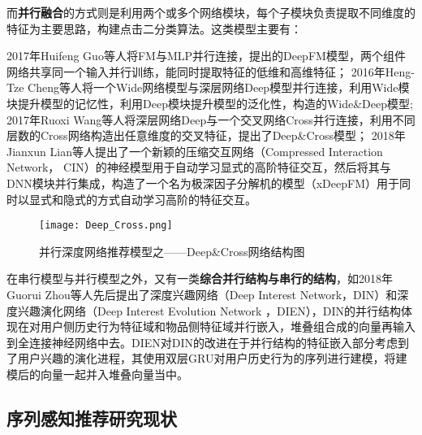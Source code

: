 而\textbf{并行融合}的方式则是利用两个或多个网络模块，每个子模块负责提取不同维度的特征为主要思路，构建点击二分类算法。这类模型主要有：


2017年Huifeng Guo等人将FM与MLP并行连接，提出的DeepFM模型，两个组件网络共享同一个输入并行训练，能同时提取特征的低维和高维特征；
2016年Heng-Tze Cheng等人将一个Wide网络模型与深层网络Deep模型并行连接，利用Wide模块提升模型的记忆性，利用Deep模块提升模型的泛化性，构造的Wide\&Deep模型;
2017年Ruoxi Wang等人将深层网络Deep与一个交叉网络Cross并行连接，利用不同层数的Cross网络构造出任意维度的交叉特征，提出了Deep\&Cross模型；
2018年Jianxun Lian等人提出了一个新颖的压缩交互网络（Compressed Interaction Network， CIN）的神经模型用于自动学习显式的高阶特征交互，然后将其与DNN模块并行集成，构造了一个名为极深因子分解机的模型（xDeepFM）用于同时以显式和隐式的方式自动学习高阶的特征交互。
\begin{figure}[htb]
  \centering
  \texttt{[image: Deep\_Cross.png]}\\
  \caption{并行深度网络推荐模型之——Deep\&Cross网络结构图}
  \label{fig:Deep_Cross}
\end{figure}
在串行模型与并行模型之外，又有一类\textbf{综合并行结构与串行的结构}，如2018年Guorui Zhou等人先后提出了深度兴趣网络（Deep Interest Network，DIN）和深度兴趣演化网络（Deep Interest Evolution Network ，DIEN），DIN的并行结构体现在对用户侧历史行为特征域和物品侧特征域并行嵌入，堆叠组合成的向量再输入到全连接神经网络中去。DIEN对DIN的改进在于并行结构的特征嵌入部分考虑到了用户兴趣的演化进程，其使用双层GRU对用户历史行为的序列进行建模，将建模后的向量一起并入堆叠向量当中。

\subsection{序列感知推荐研究现状}

